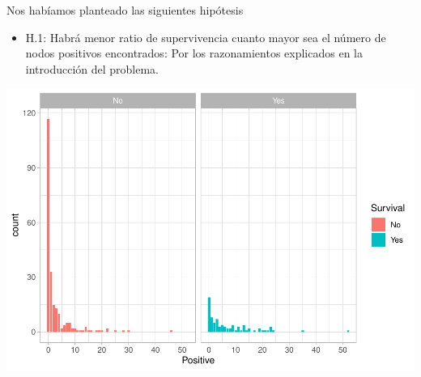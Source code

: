 \documentclass[
]{article}
\newenvironment{Shaded}{\begin{snugshade}}{\end{snugshade}}
\newcommand{\DataTypeTok}[1]{\textcolor[rgb]{0.13,0.29,0.53}{#1}}
\newcommand{\DecValTok}[1]{\textcolor[rgb]{0.00,0.00,0.81}{#1}}
\newcommand{\KeywordTok}[1]{\textcolor[rgb]{0.13,0.29,0.53}{\textbf{#1}}}
\newcommand{\NormalTok}[1]{#1}
\newcommand{\OperatorTok}[1]{\textcolor[rgb]{0.81,0.36,0.00}{\textbf{#1}}}
\newcommand{\StringTok}[1]{\textcolor[rgb]{0.31,0.60,0.02}{#1}}
\providecommand{\tightlist}{%
  \setlength{\itemsep}{0pt}\setlength{\parskip}{0pt}}
\begin{document}
Nos habíamos planteado las siguientes hipótesis

\begin{itemize}
\tightlist
\item
  H.1: Habrá menor ratio de supervivencia cuanto mayor sea el número de
  nodos positivos encontrados: Por los razonamientos explicados en la
  introducción del problema.
\end{itemize}

\begin{Shaded}
\end{Shaded}

\begin{center}\includegraphics{EDA2_files/figure-latex/unnamed-chunk-31-1} \end{center}

\begin{Shaded}
\end{Shaded}
\end{document}
